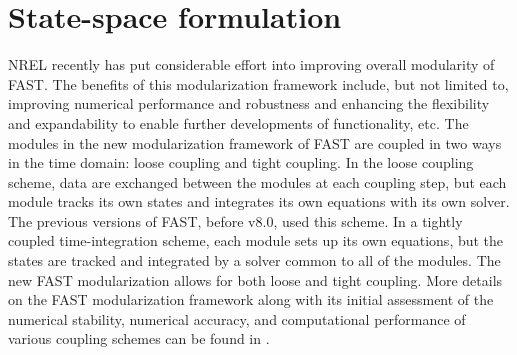 \documentclass{aiaa-tc}
\begin{document}
\section{State-space formulation}
NREL recently has put considerable effort into improving overall modularity of FAST.  The benefits of this modularization framework include, but not limited to, improving numerical performance and robustness and enhancing the flexibility and expandability to enable further developments of functionality, etc. The modules in the new modularization framework of FAST are coupled in two ways in the time domain: loose coupling and tight coupling. In the loose coupling scheme, data are exchanged between the modules at each coupling step, but each module tracks its own states and integrates its own equations with its own solver. The previous versions of FAST, before v8.0, used this scheme. In a tightly coupled time-integration scheme, each module sets up its own equations, but the states are tracked and integrated by a solver common to all of the modules. The new FAST modularization allows for both loose and tight coupling. More details on the FAST modularization framework along with its initial assessment of the numerical stability, numerical accuracy, and computational performance of various coupling schemes can be found in \cite{Jonkman:2013,Sprague:2013,Sprague:FAST2014}. 
\end{document}
